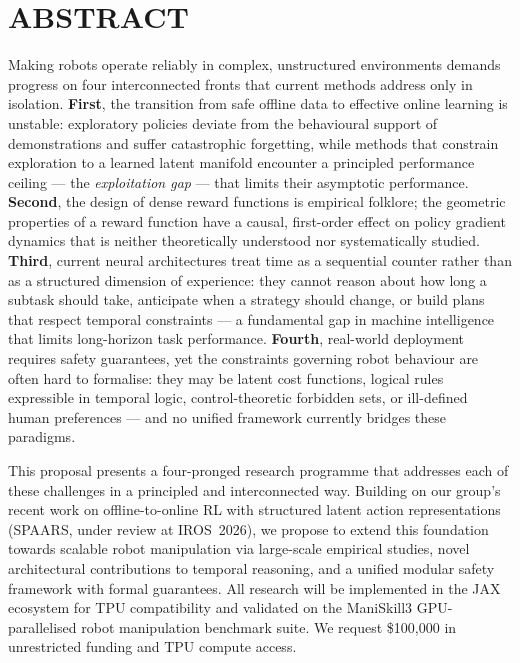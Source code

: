 \documentclass[11pt,a4paper]{article}
\begin{document}
\section*{ABSTRACT}

Making robots operate reliably in complex, unstructured environments demands progress
on four interconnected fronts that current methods address only in isolation.
\textbf{First}, the transition from safe offline data to effective online learning is
unstable: exploratory policies deviate from the behavioural support of demonstrations
and suffer catastrophic forgetting, while methods that constrain exploration to a learned
latent manifold encounter a principled performance ceiling --- the \emph{exploitation gap}
--- that limits their asymptotic performance.
\textbf{Second}, the design of dense reward functions is empirical folklore;
the geometric properties of a reward function have a causal, first-order effect on
policy gradient dynamics that is neither theoretically understood nor systematically studied.
\textbf{Third}, current neural architectures treat time as a sequential counter rather
than as a structured dimension of experience: they cannot reason about how long a
subtask should take, anticipate when a strategy should change, or build plans
that respect temporal constraints --- a fundamental gap in machine intelligence
that limits long-horizon task performance.
\textbf{Fourth}, real-world deployment requires safety guarantees, yet the constraints
governing robot behaviour are often hard to formalise: they may be latent cost functions,
logical rules expressible in temporal logic, control-theoretic forbidden sets, or
ill-defined human preferences --- and no unified framework currently bridges these paradigms.

This proposal presents a four-pronged research programme that addresses each of these
challenges in a principled and interconnected way.
Building on our group's recent work on offline-to-online RL with structured latent
action representations (SPAARS, under review at IROS~2026), we propose to extend
this foundation towards scalable robot manipulation via large-scale empirical studies,
novel architectural contributions to temporal reasoning, and a unified modular safety
framework with formal guarantees.
All research will be implemented in the JAX ecosystem for TPU compatibility
and validated on the ManiSkill3 GPU-parallelised robot manipulation benchmark suite.
We request \$100{,}000 in unrestricted funding and TPU compute access.
\end{document}
